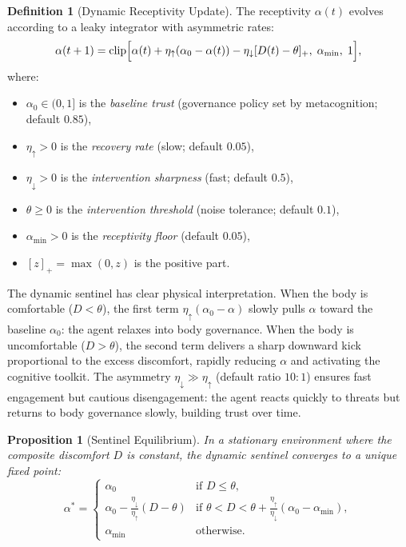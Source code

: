 \documentclass[11pt,a4paper]{article}
\newtheorem{proposition}[theorem]{Proposition}
\theoremstyle{definition}
\newtheorem{definition}[theorem]{Definition}
\begin{document}
\begin{definition}[Dynamic Receptivity Update]
\label{def:alpha_update}
The receptivity $\alpha(t)$ evolves according to a leaky integrator with
asymmetric rates:
\begin{equation}
\label{eq:alpha_update}
\alpha(t+1) = \mathrm{clip}\Bigl[
  \alpha(t) + \eta_{\uparrow}(\alpha_0 - \alpha(t))
  - \eta_{\downarrow}[D(t) - \theta]_{+},
  \;\alpha_{\min},\; 1
\Bigr],
\end{equation}
where:
\begin{itemize}[nosep]
  \item $\alpha_0 \in (0,1]$ is the \emph{baseline trust} (governance
    policy set by metacognition; default $0.85$),
  \item $\eta_{\uparrow} > 0$ is the \emph{recovery rate} (slow; default $0.05$),
  \item $\eta_{\downarrow} > 0$ is the \emph{intervention sharpness}
    (fast; default $0.5$),
  \item $\theta \geq 0$ is the \emph{intervention threshold}
    (noise tolerance; default $0.1$),
  \item $\alpha_{\min} > 0$ is the \emph{receptivity floor} (default $0.05$),
  \item $[z]_{+} = \max(0, z)$ is the positive part.
\end{itemize}
\end{definition}

The dynamic sentinel has clear physical interpretation.
When the body is comfortable ($D < \theta$), the first
term $\eta_{\uparrow}(\alpha_0 - \alpha)$ slowly pulls $\alpha$ toward
the baseline $\alpha_0$: the agent relaxes into body governance.
When the body is uncomfortable ($D > \theta$), the second
term delivers a sharp downward kick proportional to the excess discomfort,
rapidly reducing $\alpha$ and activating the cognitive toolkit.
The asymmetry $\eta_{\downarrow} \gg \eta_{\uparrow}$ (default ratio $10:1$)
ensures fast engagement but cautious disengagement: the agent reacts quickly
to threats but returns to body governance slowly, building trust over time.

\begin{proposition}[Sentinel Equilibrium]
\label{prop:sentinel_eq}
In a stationary environment where the composite discomfort $D$ is constant,
the dynamic sentinel converges to a unique fixed point:
\begin{equation}
\alpha^{*} =
\begin{cases}
\alpha_0 & \text{if } D \leq \theta, \\
\alpha_0 - \frac{\eta_{\downarrow}}{\eta_{\uparrow}}
  (D - \theta) & \text{if } \theta < D <
  \theta + \frac{\eta_{\uparrow}}{\eta_{\downarrow}}(\alpha_0 - \alpha_{\min}), \\
\alpha_{\min} & \text{otherwise.}
\end{cases}
\end{equation}
\end{proposition}
\end{document}
